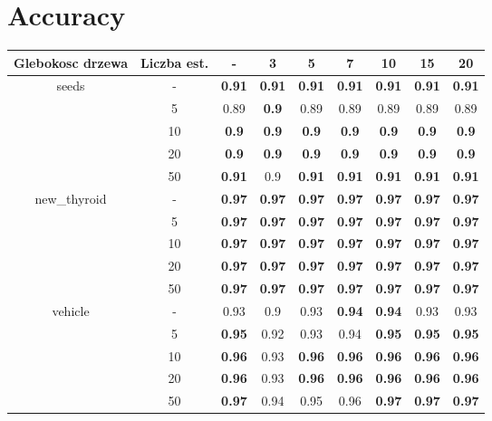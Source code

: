 \documentclass{article}%
\begin{document}
%
\normalsize%
\section*{Accuracy}%
\begin{tabular}{c|c|ccccccc}%
\hline%
Glebokosc drzewa&Liczba est.&{-}&3&5&7&10&15&20\\%
\hline%
\multirow{5}{*}{seeds}&{-}&\textbf{0.91}&\textbf{0.91}&\textbf{0.91}&\textbf{0.91}&\textbf{0.91}&\textbf{0.91}&\textbf{0.91}\\%
\cline{2%
-%
9}%
&5&0.89&\textbf{0.9}&0.89&0.89&0.89&0.89&0.89\\%
\cline{2%
-%
9}%
&10&\textbf{0.9}&\textbf{0.9}&\textbf{0.9}&\textbf{0.9}&\textbf{0.9}&\textbf{0.9}&\textbf{0.9}\\%
\cline{2%
-%
9}%
&20&\textbf{0.9}&\textbf{0.9}&\textbf{0.9}&\textbf{0.9}&\textbf{0.9}&\textbf{0.9}&\textbf{0.9}\\%
\cline{2%
-%
9}%
&50&\textbf{0.91}&0.9&\textbf{0.91}&\textbf{0.91}&\textbf{0.91}&\textbf{0.91}&\textbf{0.91}\\%
\hline%
\multirow{5}{*}{new\_thyroid}&{-}&\textbf{0.97}&\textbf{0.97}&\textbf{0.97}&\textbf{0.97}&\textbf{0.97}&\textbf{0.97}&\textbf{0.97}\\%
\cline{2%
-%
9}%
&5&\textbf{0.97}&\textbf{0.97}&\textbf{0.97}&\textbf{0.97}&\textbf{0.97}&\textbf{0.97}&\textbf{0.97}\\%
\cline{2%
-%
9}%
&10&\textbf{0.97}&\textbf{0.97}&\textbf{0.97}&\textbf{0.97}&\textbf{0.97}&\textbf{0.97}&\textbf{0.97}\\%
\cline{2%
-%
9}%
&20&\textbf{0.97}&\textbf{0.97}&\textbf{0.97}&\textbf{0.97}&\textbf{0.97}&\textbf{0.97}&\textbf{0.97}\\%
\cline{2%
-%
9}%
&50&\textbf{0.97}&\textbf{0.97}&\textbf{0.97}&\textbf{0.97}&\textbf{0.97}&\textbf{0.97}&\textbf{0.97}\\%
\hline%
\multirow{5}{*}{vehicle}&{-}&0.93&0.9&0.93&\textbf{0.94}&\textbf{0.94}&0.93&0.93\\%
\cline{2%
-%
9}%
&5&\textbf{0.95}&0.92&0.93&0.94&\textbf{0.95}&\textbf{0.95}&\textbf{0.95}\\%
\cline{2%
-%
9}%
&10&\textbf{0.96}&0.93&\textbf{0.96}&\textbf{0.96}&\textbf{0.96}&\textbf{0.96}&\textbf{0.96}\\%
\cline{2%
-%
9}%
&20&\textbf{0.96}&0.93&\textbf{0.96}&\textbf{0.96}&\textbf{0.96}&\textbf{0.96}&\textbf{0.96}\\%
\cline{2%
-%
9}%
&50&\textbf{0.97}&0.94&0.95&0.96&\textbf{0.97}&\textbf{0.97}&\textbf{0.97}\\%

\end{tabular}
\end{document}
